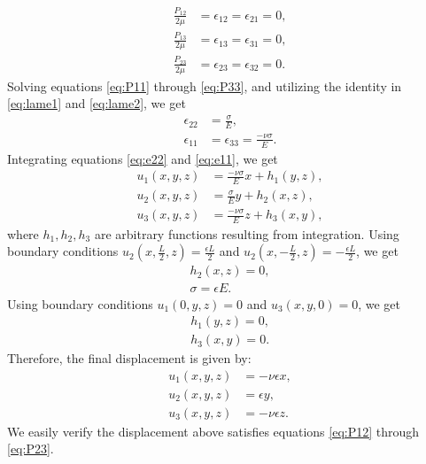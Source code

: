 \documentclass[a4paper]{article}
\begin{document}
\begin{align}
  \frac{P_{12}}{2\mu} & = \epsilon_{12} = \epsilon_{21} = 0,
  \label{eq:P12}                                             \\
  \frac{P_{13}}{2\mu} & = \epsilon_{13} = \epsilon_{31} = 0,
  \label{eq:P13}                                             \\
  \frac{P_{23}}{2\mu} & = \epsilon_{23} = \epsilon_{32} = 0.
  \label{eq:P23}
\end{align}
Solving equations \eqref{eq:P11} through \eqref{eq:P33}, and utilizing the
identity in \eqref{eq:lame1} and \eqref{eq:lame2}, we get
\begin{align}
  \epsilon_{22} & = \frac{\sigma}{E}\label{eq:e22},                       \\
  \epsilon_{11} & = \epsilon_{33} = \frac{-\nu \sigma}{E}. \label{eq:e11}
\end{align}
Integrating equations \eqref{eq:e22} and \eqref{eq:e11}, we get
\begin{align}
  u_1(x,y,z) & = \frac{-\nu \sigma}{E}x + h_1(y,z), \label{eq:u1} \\
  u_2(x,y,z) & = \frac{\sigma}{E}y + h_2(x,z), \label{eq:u2}      \\
  u_3(x,y,z) & = \frac{-\nu \sigma}{E}z + h_3(x,y), \label{eq:u3}
\end{align}
where $h_1, h_2, h_3$ are arbitrary functions resulting from integration.
Using boundary conditions $u_2(x,\frac{L}{2},z) =\frac{\epsilon L}{2}$ and
$u_2(x,-\frac{L}{2},z) = -\frac{\epsilon L}{2}$, we get
\begin{align*}
  h_2(x,z) = 0, \\
  \sigma = \epsilon E.
\end{align*}
Using boundary conditions $u_1(0,y,z) = 0$ and $u_3(x,y,0) = 0$, we get
\begin{align*}
  h_1(y, z) = 0, \\
  h_3(x, y) = 0.
\end{align*}
Therefore, the final displacement is given by:
\begin{align*}
  u_1(x,y,z) & = -\nu \epsilon x, \\
  u_2(x,y,z) & = \epsilon y,      \\
  u_3(x,y,z) & = -\nu \epsilon z.
\end{align*}
We easily verify the displacement above satisfies equations \eqref{eq:P12}
through \eqref{eq:P23}.
\end{document}
